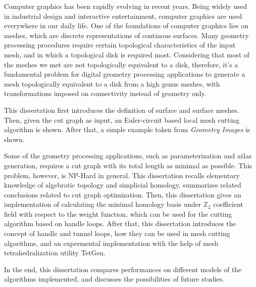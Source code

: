 \begin{abstract*}
  Computer graphics has been rapidly evolving in recent years. Being widely used in industrial design and interactive entertainment, computer graphics are used everywhere in our daily life. One of the foundations of computer graphics lies on meshes, which are discrete representations of continous surfaces. Many geometry processing procedures require certain topological characteristics of the input mesh, and in which a topological disk is required most. Considering that most of the meshes we met are not topologically equivalent to a disk, therefore, it's a fundamental problem for digital geometry processing applications to generate a mesh topologically equivalent to a disk from a high genus meshes, with transformations imposed on connectivity instead of geometry only. 

  This dissertation first introduces the definition of surface and surface meshes. Then, given the cut graph as input, an Euler-circuit based local mesh cutting algorithm is shown. After that, a simple example taken from \textit{Geometry Images} is shown.

  Some of the grometry processing applications, such as parameterization and atlas generation, requires a cut graph with its total length as minimal as possible. This problem, however, is NP-Hard in general. This dissertation recalls elementary knowledge of algebratic topology and simplicial homology, summarizes related conclusions related to cut graph optimization. Then, this dissertation gives an implementation of calculating the minimal homology basis under $ \mathbb{Z}_2 $ coefficient field with respect to the weight function, which can be used for the cutting algorithm based on handle loops. After that, this dissertation introduces the concept of handle and tunnel loops, how they can be used in mesh cutting algorithms, and an expermental implementation with the help of mesh tetrahedralization utility TetGen.

  In the end, this dissertation compares performances on different models of the algorithms implemented, and discusses the possibilities of future studies.


\end{abstract*}
